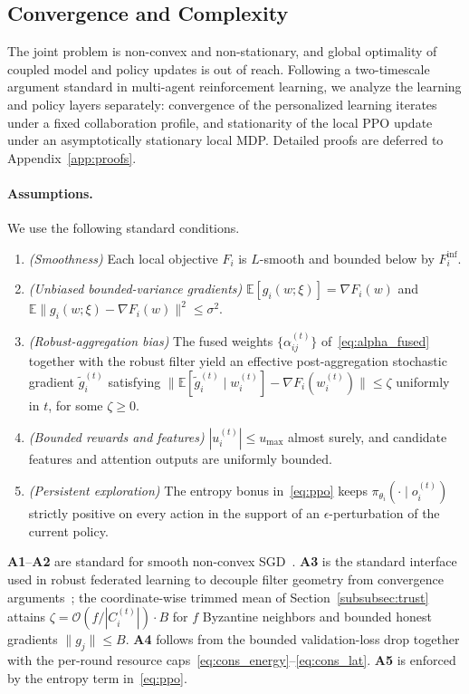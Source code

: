 \subsection{Convergence and Complexity}
\label{subsec:convergence}

The joint problem is non-convex and non-stationary, and global optimality of coupled model and policy updates is out of reach. Following a two-timescale argument standard in multi-agent reinforcement learning, we analyze the learning and policy layers separately: convergence of the personalized learning iterates under a fixed collaboration profile, and stationarity of the local PPO update under an asymptotically stationary local MDP. Detailed proofs are deferred to Appendix~\ref{app:proofs}.

\paragraph{Assumptions.}
We use the following standard conditions.
\begin{enumerate}
    \item[\textbf{A1.}] \emph{(Smoothness)} Each local objective $F_i$ is $L$-smooth and bounded below by $F_i^{\inf}$.
    \item[\textbf{A2.}] \emph{(Unbiased bounded-variance gradients)} $\mathbb{E}[g_i(w;\xi)]=\nabla F_i(w)$ and $\mathbb{E}\|g_i(w;\xi)-\nabla F_i(w)\|^2\le\sigma^2$.
    \item[\textbf{A3.}] \emph{(Robust-aggregation bias)} The fused weights $\{\alpha_{ij}^{(t)}\}$ of~\eqref{eq:alpha_fused} together with the robust filter yield an effective post-aggregation stochastic gradient $\tilde g_i^{(t)}$ satisfying $\|\mathbb{E}[\tilde g_i^{(t)}\mid w_i^{(t)}]-\nabla F_i(w_i^{(t)})\|\le\zeta$ uniformly in $t$, for some $\zeta\ge 0$.
    \item[\textbf{A4.}] \emph{(Bounded rewards and features)} $|u_i^{(t)}|\le u_{\max}$ almost surely, and candidate features and attention outputs are uniformly bounded.
    \item[\textbf{A5.}] \emph{(Persistent exploration)} The entropy bonus in~\eqref{eq:ppo} keeps $\pi_{\theta_i}(\cdot\mid o_i^{(t)})$ strictly positive on every action in the support of an $\epsilon$-perturbation of the current policy.
\end{enumerate}
\textbf{A1}--\textbf{A2} are standard for smooth non-convex SGD~\cite{bottou2018optimization}. \textbf{A3} is the standard interface used in robust federated learning to decouple filter geometry from convergence arguments~\cite{karimireddy2021learning,yin2018byzantine}; the coordinate-wise trimmed mean of Section~\ref{subsubsec:trust} attains $\zeta=\mathcal{O}(f/|C_i^{(t)}|)\cdot B$ for $f$ Byzantine neighbors and bounded honest gradients $\|g_j\|\le B$. \textbf{A4} follows from the bounded validation-loss drop together with the per-round resource caps~\eqref{eq:cons_energy}--\eqref{eq:cons_lat}. \textbf{A5} is enforced by the entropy term in~\eqref{eq:ppo}.

